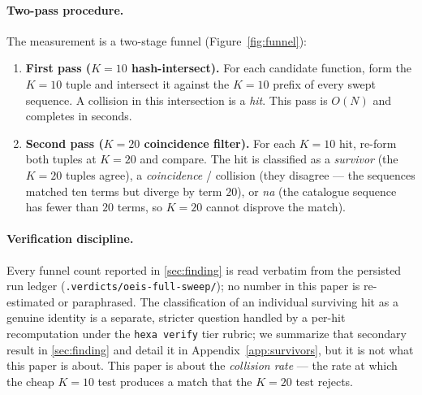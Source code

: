 \documentclass[11pt,a4paper]{article}
\newcommand{\Kten}{K\!=\!10}
\newcommand{\Ktwenty}{K\!=\!20}
\theoremstyle{definition}
\begin{document}
\paragraph{Two-pass procedure.} The measurement is a two-stage funnel
(Figure~\ref{fig:funnel}):
\begin{enumerate}
  \item \textbf{First pass ($\Kten$ hash-intersect).} For each candidate
  function, form the $\Kten$ tuple and intersect it against the $\Kten$ prefix
  of every swept sequence. A collision in this intersection is a \emph{hit}.
  This pass is $O(N)$ and completes in seconds.
  \item \textbf{Second pass ($\Ktwenty$ coincidence filter).} For each $\Kten$
  hit, re-form both tuples at $\Ktwenty$ and compare. The hit is classified as
  a \emph{survivor} (the $\Ktwenty$ tuples agree), a \emph{coincidence} /
  collision (they disagree --- the sequences matched ten terms but diverge by
  term $20$), or \emph{na} (the catalogue sequence has fewer than $20$ terms,
  so $\Ktwenty$ cannot disprove the match).
\end{enumerate}

\paragraph{Verification discipline.} Every funnel count reported in
\textsection\ref{sec:finding} is read verbatim from the persisted run ledger
(\texttt{.verdicts/oeis-full-sweep/}); no number in this paper is re-estimated
or paraphrased. The classification of an individual surviving hit as a genuine
identity is a separate, stricter question handled by a per-hit recomputation
under the \texttt{hexa verify} tier rubric; we summarize that secondary result
in \textsection\ref{sec:finding} and detail it in
Appendix~\ref{app:survivors}, but it is not what this paper is about. This
paper is about the \emph{collision rate} --- the rate at which the cheap
$\Kten$ test produces a match that the $\Ktwenty$ test rejects.
\end{document}
